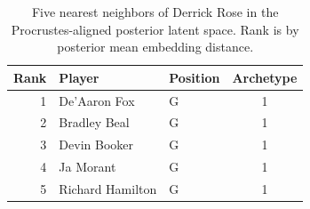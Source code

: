 \begin{table}[htbp]
  \centering\small
  \begin{tabular}{rllc}
    \toprule
    Rank & Player & Position & Archetype \\
    \midrule
    1 & De'Aaron Fox & G & 1 \\
    2 & Bradley Beal & G & 1 \\
    3 & Devin Booker & G & 1 \\
    4 & Ja Morant & G & 1 \\
    5 & Richard Hamilton & G & 1 \\
    \bottomrule
  \end{tabular}
  \caption{Five nearest neighbors of Derrick Rose in the Procrustes-aligned posterior latent space. Rank is by posterior mean embedding distance.}
  \label{tab:Derrick_Rose_neighbors}
\end{table}

